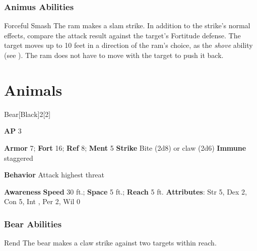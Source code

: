 \subsubsection{Animus Abilities}

\begin{freeability}{Forceful Smash}
The ram makes a slam strike.
In addition to the strike's normal effects, compare the attack result against the target's Fortitude defense.
\hit The target moves up to 10 feet in a direction of the ram's choice, as the \textit{shove} ability (see ).
The ram does not have to move with the target to push it back.
\end{freeability}

\section{Animals}
\begin{monsection}{Bear}[Black]{2}[2]
\vspace{-1em}\vspace{-1em}
\begin{spellcontent}
\begin{spelltargetinginfo}
{\textbf{AP} 3}

\pari \textbf{Armor} 7;
\textbf{Fort} 16;
\textbf{Ref} 8;
\textbf{Ment} 5
\pari \textbf{Strike} Bite  (2d8) or claw  (2d6)
\pari \textbf{Immune} staggered


\pari \textbf{Behavior} Attack highest threat
\end{spelltargetinginfo}
\end{spellcontent}

\begin{monsterfooter}
\pari \textbf{Awareness} 
\pari \textbf{Speed} 30 ft.;
\textbf{Space} 5 ft.;
\textbf{Reach} 5 ft.
\pari \textbf{Attributes}:
Str 5,
Dex 2,
Con 5,
Int ,
Per 2,
Wil 0
\end{monsterfooter}
\end{monsection}


\subsubsection{Bear Abilities}

\begin{freeability}{Rend}
The bear makes a claw strike against two targets within reach.
\end{freeability}

